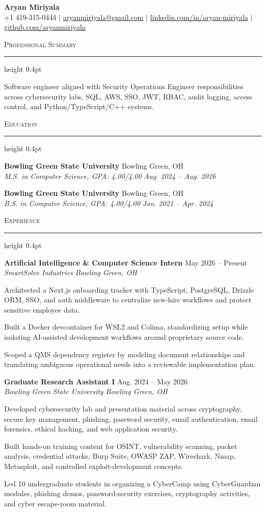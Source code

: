 \documentclass[letterpaper,11pt]{article}
\newcommand{\resumesection}[1]{%
  \par\vspace{2pt}%
  {\large\scshape #1}\par\vspace{2pt}%
  \hrule height 0.4pt\vspace{2pt}%
}
\newcommand{\resumeSubheading}[4]{
  \textbf{#1} \hfill #2\\
  \textit{#3} \hfill \textit{#4}
}
\begin{document}
\begin{center}
  {\LARGE \textbf{Aryan Miriyala}}\\[-1pt]
  \small
  +1 419-315-0444 $|$
  \href{mailto:aryanmiriyala@gmail.com}{aryanmiriyala@gmail.com} $|$
  \href{https://www.linkedin.com/in/aryan-miriyala-7788a21b6/}{linkedin.com/in/aryan-miriyala} $|$
  \href{https://github.com/aryanmiriyala}{github.com/aryanmiriyala}
\end{center}\vspace{-10pt}

\resumesection{Professional Summary}
Software engineer aligned with Security Operations Engineer responsibilities across cybersecurity labs, SQL, AWS, SSO, JWT, RBAC, audit logging, access control, and Python/TypeScript/C++ systems.

\resumesection{Education}
\resumeSubheading
{Bowling Green State University}{Bowling Green, OH}
{M.S. in Computer Science, GPA: 4.00/4.00}{Aug. 2024 -- Aug. 2026}

\resumeSubheading
{Bowling Green State University}{Bowling Green, OH}
{B.S. in Computer Science, GPA: 4.00/4.00}{Jan. 2021 -- Apr. 2024}

\resumesection{Experience}
\resumeSubheading
{Artificial Intelligence \& Computer Science Intern}{May 2026 -- Present}
{SmartSolve Industries}{Bowling Green, OH}
\begin{tightitemize}
  \item Architected a Next.js onboarding tracker with TypeScript, PostgreSQL, Drizzle ORM, SSO, and auth middleware to centralize new-hire workflows and protect sensitive employee data.
  \item Built a Docker devcontainer for WSL2 and Colima, standardizing setup while isolating AI-assisted development workflows around proprietary source code.
  \item Scoped a QMS dependency register by modeling document relationships and translating ambiguous operational needs into a reviewable implementation plan.
\end{tightitemize}

\resumeSubheading
{Graduate Research Assistant I}{Aug. 2024 -- May 2026}
{Bowling Green State University}{Bowling Green, OH}
\begin{tightitemize}
  \item Developed cybersecurity lab and presentation material across cryptography, secure key management, phishing, password security, email authentication, email forensics, ethical hacking, and web application security.
  \item Built hands-on training content for OSINT, vulnerability scanning, packet analysis, credential attacks, Burp Suite, OWASP ZAP, Wireshark, Nmap, Metasploit, and controlled exploit-development concepts.
  \item Led 10 undergraduate students in organizing a CyberCamp using CyberGuardian modules, phishing demos, password-security exercises, cryptography activities, and cyber escape-room material.
\end{tightitemize}
\end{document}
